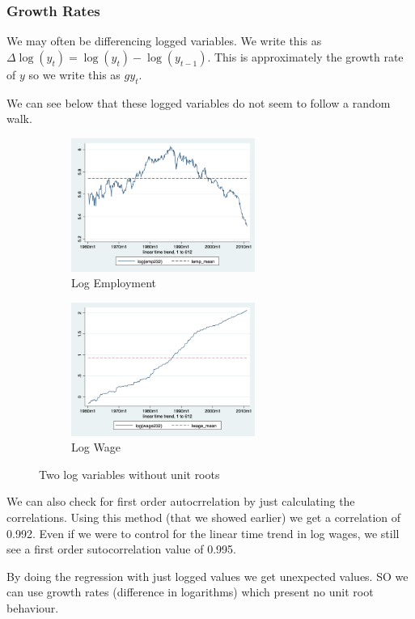 \documentclass[11pt]{article}
\begin{document}
\subsubsection{Growth Rates}

We may often be differencing logged variables. We write this as $\Delta \log (y_t) = \log (y_t) - \log (y_{t-1})$. This is approximately the growth rate of $y$ so we write this as $gy_t$.

We can see below that these logged variables do not seem to follow a random walk.
\begin{figure}[h]
\centering
\begin{subfigure}{.5\textwidth}
  \centering
  \includegraphics[width=6cm]{photos/lemp.png}
  \caption{Log Employment}
  \label{fig:sub1}
\end{subfigure}%
\begin{subfigure}{.5\textwidth}
  \centering
  \includegraphics[width=6cm]{photos/lwage.png}
  \caption{Log Wage}
  \label{fig:sub2}
\end{subfigure}
\caption{Two log variables without unit roots}
\label{fig:lemp lwage}
\end{figure}

We can also check for first order autocrrelation by just calculating the correlations. Using this method (that we showed earlier) we get a correlation of 0.992. Even if we were to control for the linear time trend in log wages, we still see a first order sutocorrelation value of 0.995.

By doing the regression with just logged values we get unexpected values. SO we can use growth rates (difference in logarithms) which present no unit root behaviour.
\end{document}
